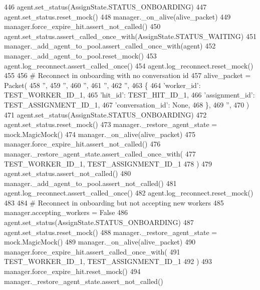 \begin{DoxyCode}
446         agent.set\_status(AssignState.STATUS\_ONBOARDING)
447         agent.set\_status.reset\_mock()
448         manager.\_on\_alive(alive\_packet)
449         manager.force\_expire\_hit.assert\_not\_called()
450         agent.set\_status.assert\_called\_once\_with(AssignState.STATUS\_WAITING)
451         manager.\_add\_agent\_to\_pool.assert\_called\_once\_with(agent)
452         manager.\_add\_agent\_to\_pool.reset\_mock()
453         agent.log\_reconnect.assert\_called\_once()
454         agent.log\_reconnect.reset\_mock()
455 
456         \textcolor{comment}{# Reconnect in onboarding with no conversation id}
457         alive\_packet = Packet(
458             \textcolor{stringliteral}{''},
459             \textcolor{stringliteral}{''},
460             \textcolor{stringliteral}{''},
461             \textcolor{stringliteral}{''},
462             \textcolor{stringliteral}{''},
463             \{
464                 \textcolor{stringliteral}{'worker\_id'}: TEST\_WORKER\_ID\_1,
465                 \textcolor{stringliteral}{'hit\_id'}: TEST\_HIT\_ID\_1,
466                 \textcolor{stringliteral}{'assignment\_id'}: TEST\_ASSIGNMENT\_ID\_1,
467                 \textcolor{stringliteral}{'conversation\_id'}: \textcolor{keywordtype}{None},
468             \},
469             \textcolor{stringliteral}{''},
470         )
471         agent.set\_status(AssignState.STATUS\_ONBOARDING)
472         agent.set\_status.reset\_mock()
473         manager.\_restore\_agent\_state = mock.MagicMock()
474         manager.\_on\_alive(alive\_packet)
475         manager.force\_expire\_hit.assert\_not\_called()
476         manager.\_restore\_agent\_state.assert\_called\_once\_with(
477             TEST\_WORKER\_ID\_1, TEST\_ASSIGNMENT\_ID\_1
478         )
479         agent.set\_status.assert\_not\_called()
480         manager.\_add\_agent\_to\_pool.assert\_not\_called()
481         agent.log\_reconnect.assert\_called\_once()
482         agent.log\_reconnect.reset\_mock()
483 
484         \textcolor{comment}{# Reconnect in onboarding but not accepting new workers}
485         manager.accepting\_workers = \textcolor{keyword}{False}
486         agent.set\_status(AssignState.STATUS\_ONBOARDING)
487         agent.set\_status.reset\_mock()
488         manager.\_restore\_agent\_state = mock.MagicMock()
489         manager.\_on\_alive(alive\_packet)
490         manager.force\_expire\_hit.assert\_called\_once\_with(
491             TEST\_WORKER\_ID\_1, TEST\_ASSIGNMENT\_ID\_1
492         )
493         manager.force\_expire\_hit.reset\_mock()
494         manager.\_restore\_agent\_state.assert\_not\_called()

\end{DoxyCode}
